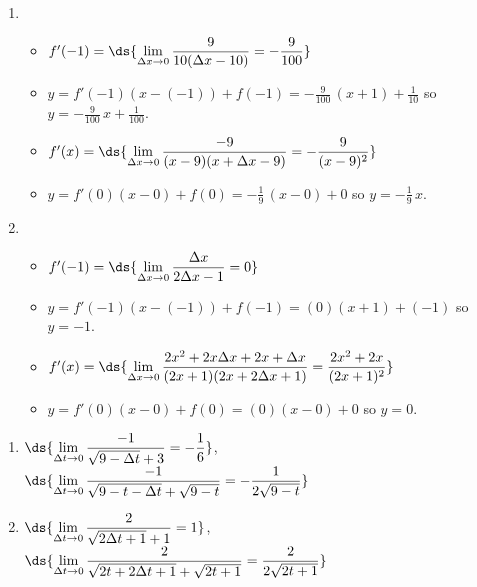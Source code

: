 \documentclass{ximera}
\begin{document}
\begin{enumerate}
\setcounter{enumi}{\value{HW}}

\item   \begin{itemize}

\item  $f'(-1) = \ds{ \lim_{\Delta x \rightarrow 0} \dfrac{9}{10(\Delta x - 10)} = -\dfrac{9}{100}}$

\smallskip

\item $y = f'(-1)(x-(-1)) + f(-1) = -\frac{9}{100} \, (x+1) + \frac{1}{10}$ so $y = - \frac{9}{100} \, x + \frac{1}{100}$.

\smallskip

\item  $f'(x) =\ds{ \lim_{\Delta x \rightarrow 0} \dfrac{-9}{(x - 9)(x + \Delta x - 9)} =   -\dfrac{9}{(x-9)^2}}$   

\smallskip  

\item  $y = f'(0)(x-0) + f(0) = -\frac{1}{9} \, (x-0)+0$ so $y = -\frac{1}{9} \, x$.

\smallskip

\end{itemize}

\item \begin{itemize}  

\item  $f'(-1) = \ds{ \lim_{\Delta x \rightarrow 0} \dfrac{\Delta x}{2 \Delta x - 1} = 0}$

\smallskip

\item $y = f'(-1)(x-(-1)) + f(-1) = (0) (x+1) + (-1)$ so $y = -1$.

\smallskip

\item  $f'(x) =\ds{ \lim_{\Delta x \rightarrow 0}\dfrac{2x^2+2x\Delta x+2x+\Delta x}{(2x+1)(2x+2\Delta x+1)}=  \dfrac{2x^2+2x}{(2x+1)^2}}$

\smallskip

\item  $y = f'(0)(x-0) + f(0) = (0)(x-0)+0$ so $y = 0$.

\smallskip

\end{itemize}


\setcounter{HW}{\value{enumi}}
\end{enumerate}

\begin{enumerate}
\setcounter{enumi}{\value{HW}}

\item  $\ds{ \lim_{\Delta t \rightarrow 0}\dfrac{-1}{\sqrt{9-\Delta t} +3}  = -\dfrac{1}{6}}$,   $\ds{ \lim_{\Delta t \rightarrow 0} \dfrac{-1}{\sqrt{9-t-\Delta t} + \sqrt{9-t}}=   -\dfrac{1}{2 \sqrt{9-t}}}$   
\item  $\ds{ \lim_{\Delta t \rightarrow 0}\dfrac{2}{\sqrt{2\Delta t+1} + 1}  =1}$,   $\ds{ \lim_{\Delta t \rightarrow 0}\dfrac{2}{\sqrt{2t+2\Delta t+1} + \sqrt{2t+1}}=   \dfrac{2}{2 \sqrt{2t+1}}}$    

\setcounter{HW}{\value{enumi}}
\end{enumerate}
\end{document}

